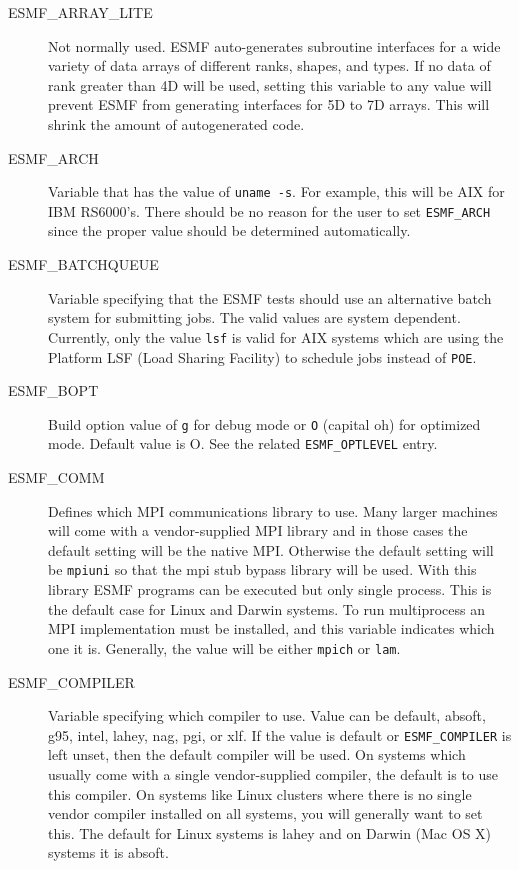 \begin{description}

\item[ESMF\_ARRAY\_LITE]

Not normally used.   ESMF auto-generates subroutine interfaces for a wide
variety of data arrays of different ranks, shapes, and types.  If no data of
rank greater than 4D will be used, setting this variable to any value will
prevent ESMF from generating interfaces for 5D to 7D arrays.  This will
shrink the amount of autogenerated code.

\item[ESMF\_ARCH] 

Variable that has the value of {\tt uname -s}.  For example, this will be
AIX for IBM RS6000's.  There should be no reason for the user to set 
{\tt ESMF\_ARCH} since the proper value should be determined automatically.

\item[ESMF\_BATCHQUEUE] 

Variable specifying that the ESMF tests should use an alternative batch
system for submitting jobs.  The valid values are system dependent.
Currently, only the value {\tt lsf} is valid for AIX systems which 
are using the Platform LSF (Load Sharing Facility) to schedule jobs
instead of {\tt POE}.

\item[ESMF\_BOPT] 

Build option value of {\tt g} for debug mode or {\tt O} (capital oh) for
optimized mode.  Default value is O.  See the related {\tt ESMF\_OPTLEVEL}
entry.

\item[ESMF\_COMM] 

Defines which MPI communications library to use.  Many larger machines
will come with a vendor-supplied  MPI library and in those cases the
default setting will be the native MPI.  Otherwise the default setting will
be {\tt mpiuni} so that the mpi stub bypass library will be used.  
With this library ESMF programs can be executed but only single process.
This is the default case for Linux and Darwin systems.  
To run multiprocess an MPI implementation must be installed, and this
variable indicates which one it is.  Generally, the value will be either
{\tt mpich} or {\tt lam}.

\item[ESMF\_COMPILER]

Variable specifying which compiler to use.  Value can be default,
absoft, g95, intel, lahey, nag, pgi, or xlf.  If the value is default 
or {\tt ESMF\_COMPILER} is left unset, then the default compiler will be
used. On systems which usually come with a single vendor-supplied
compiler, the default is to use this compiler.  On systems like
Linux clusters where there is no single vendor compiler installed
on all systems, you will generally want to set this.
The default for Linux systems is lahey and on Darwin (Mac OS X)
systems it is absoft.


\end{description}
